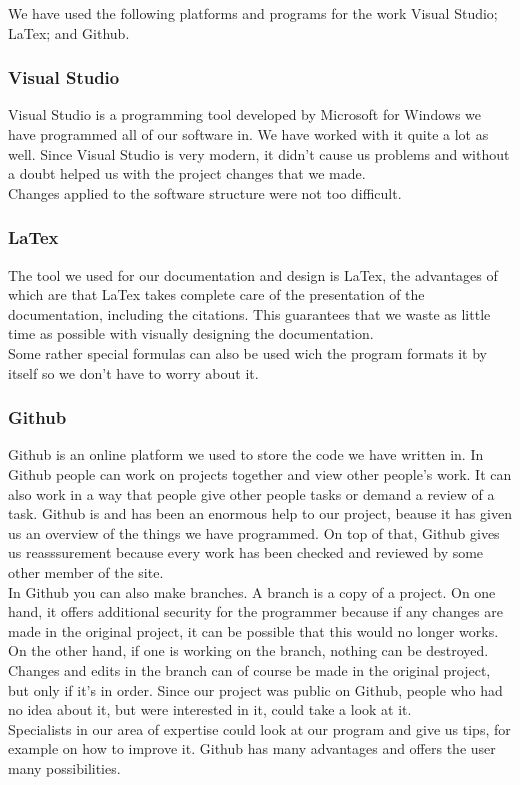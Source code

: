We have used the following platforms and programs for the work  Visual Studio; LaTex; and Github.\\

\subsubsection {Visual Studio}

Visual Studio is a programming tool developed by Microsoft for Windows we have programmed all of our software in. We have worked with it quite a lot as well. Since Visual Studio is very modern, it didn't cause us problems and without a doubt helped us with the project changes that we made.\\
Changes applied to the software structure were not too difficult.

\subsubsection {LaTex}

The tool we used for our documentation and design is LaTex, the advantages of which are that LaTex takes complete care of the presentation of the documentation, including the citations. This guarantees that we waste as little time as possible with visually designing the documentation. \\
Some rather special formulas can also be used wich the program formats it by itself so we don’t have to worry about it.\\

\subsubsection {Github}

Github is an online platform we used to store the code we have written in. In Github people can work on projects together and view other people's work. It can also work in a way that people give other people tasks or demand a review of a task. Github is and has been an enormous help to our project, beause it has given us an overview of the things we have programmed. On top of that, Github gives us reasssurement because every work has been checked and reviewed by some other member of the site. \\
In Github you can also make branches. A branch is a copy of a project. On one hand, it offers additional security for the programmer because if any changes are made in the original project, it can be possible that this would no longer works. On the other hand, if one is working on the branch, nothing can be destroyed. \\
Changes and edits in the branch can of course be made in the original project, but only if it's in order. Since our project was public on Github, people who had no idea about it, but were interested in it, could take a look at it. \\
Specialists in our area of expertise could look at our program and give us tips, for example on how to improve it. Github has many advantages and offers the user many possibilities.
